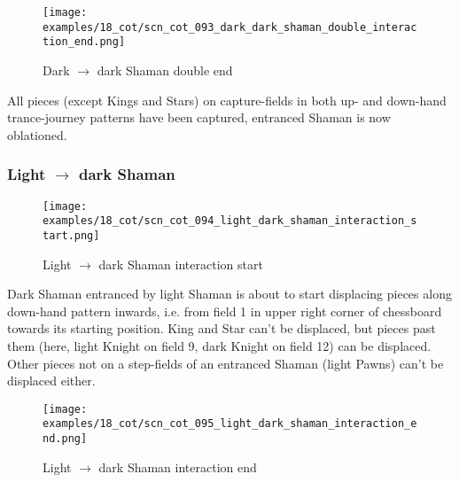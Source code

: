 \noindent
\begin{figure}[!h]
\texttt{[image: examples/18\_cot/scn\_cot\_093\_dark\_dark\_shaman\_double\_interaction\_end.png]}
\caption{Dark $\rightarrow$ dark Shaman double end}
\label{fig:scn_cot_093_dark_dark_shaman_double_interaction_end}
\end{figure}

All pieces (except Kings and Stars) on capture-fields in both up- and down-hand
trance-journey patterns have been captured, entranced Shaman is now oblationed.

\clearpage %

\subsubsection*{Light $\rightarrow$ dark Shaman}
\label{sec:Conquest of Tlalocan/Trance-journey/Interactions/Light --> dark Shaman}

\vspace*{-1.5\baselineskip}
\noindent
\begin{figure}[!h]
\texttt{[image: examples/18\_cot/scn\_cot\_094\_light\_dark\_shaman\_interaction\_start.png]}
\vspace*{-1.4\baselineskip}
\caption{Light $\rightarrow$ dark Shaman interaction start}
\label{fig:scn_cot_094_light_dark_shaman_interaction_start}
\end{figure}

\vspace*{-0.5\baselineskip}
Dark Shaman entranced by light Shaman is about to start displacing pieces along
down-hand pattern inwards, i.e. from field 1 in upper right corner of chessboard
towards its starting position. \newline
\indent
King and Star can't be displaced, but pieces past them (here, light Knight on field
9, dark Knight on field 12) can be displaced. Other pieces not on a step-fields of
an entranced Shaman (light Pawns) can't be displaced either.

\clearpage %

\noindent
\begin{figure}[!h]
\texttt{[image: examples/18\_cot/scn\_cot\_095\_light\_dark\_shaman\_interaction\_end.png]}
\caption{Light $\rightarrow$ dark Shaman interaction end}
\label{fig:scn_cot_095_light_dark_shaman_interaction_end}
\end{figure}

